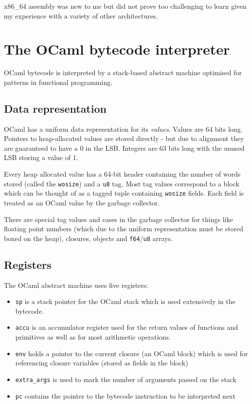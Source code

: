 x86\_64 assembly was new to me but did not prove too challenging to learn given my experience with
a variety of other architectures.

\section{The OCaml bytecode interpreter}

OCaml bytecode is interpreted by a stack-based abstract machine optimised for patterns in
functional programming.

\subsection{Data representation}

OCaml has a uniform data representation for its \emph{values}. Values are 64 bits long.
Pointers to heap-allocated values are stored directly - but due to alignment they are guaranteed to
have a 0 in
the LSB. Integers are 63 bits long with the unused LSB storing a value of 1.

Every heap allocated value has a 64-bit header containing the number of words stored (called
the \texttt{wosize}) and a \texttt{u8} tag. Most tag values correspond to a block which can be
thought of as a tagged tuple containing \texttt{wosize} fields. Each field is treated as an OCaml
value by the garbage collector.

There are special tag values and cases in the garbage collector for things like floating point
numbers (which due to the uniform representation must be stored boxed on the heap),
closures, objects and \texttt{f64}/\texttt{u8} arrays.

\subsection{Registers}

The OCaml abstract machine uses five registers:

\begin{itemize}
    \item \texttt{sp} is a stack pointer for the OCaml stack which is used extensively
          in the bytecode.
    \item \texttt{accu} is an accumulator register used for the return values of functions
          and primitives as well as for most arithmetic operations.
    \item \texttt{env} holds a pointer to the current closure (an OCaml block) which is used for
          referencing closure variables (stored as fields in the block)
    \item \texttt{extra\_args} is used to mark the number of arguments passed on the stack
    \item \texttt{pc} contains the pointer to the bytecode instruction to be interpreted next
\end{itemize}

